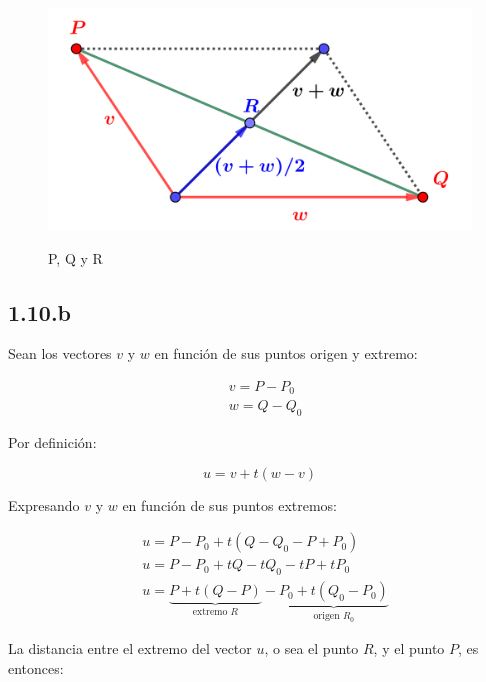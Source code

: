\documentclass{article}
\begin{document}
\begin{figure}[ht]
\caption{P, Q y R}
\includegraphics[scale=1]{../img/exercises/guide_01/10_a.png} 
\centering
\label{fig:1-10-a}
\end{figure}

\subsection*{1.10.b}
\label{subsec:1.10.b}

Sean los vectores $v$ y $w$ en función de sus puntos origen y extremo:

\begin{equation}
\begin{array}{ll}
& v = P-P_0 \\
& w = Q-Q_0
\end{array}
\end{equation}

Por definición:

\begin{equation}
u = v + t (w-v)
\end{equation}

Expresando $v$ y $w$ en función de sus puntos extremos:

\begin{subequations}
\begin{align}
& u = P - P_0 + t (Q - Q_0 - P + P_0) \\
& u = P - P_0 + t Q - t Q_0 - t P + t P_0 \\
& u = \underbrace{ P + t (Q-P) }_{\text{extremo } R} - \underbrace{ P_0 + t (Q_0 - P_0) }_{\text{origen } R_0}
\end{align}
\end{subequations}

La distancia entre el extremo del vector $u$, o sea el punto $R$, y el punto $P$, es entonces:
\end{document}
